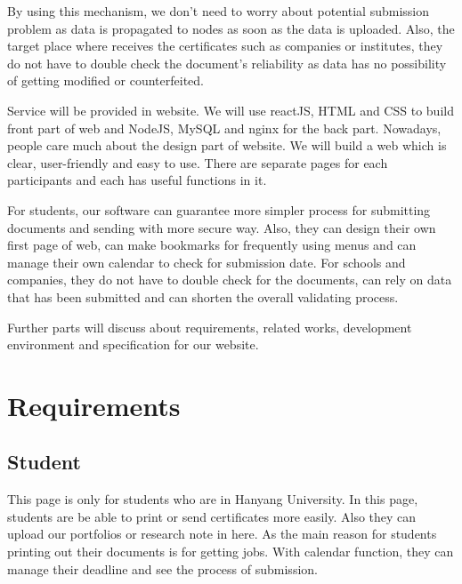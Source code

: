 \documentclass[conference]{IEEEtran}
\begin{document}
By using this mechanism, we don’t need to worry about potential submission problem as data is propagated to nodes as soon as the data is uploaded. Also, the target place where receives the certificates such as companies or institutes, they do not have to double check the document’s reliability as data has no possibility of getting modified or counterfeited.

Service will be provided in website. We will use reactJS, HTML and CSS to build front part of web and NodeJS, MySQL and nginx for the back part. Nowadays, people care much about the design part of website. We will build a web which is clear, user-friendly and easy to use. There are separate pages for each participants and each has useful functions in it. 

For students, our software can guarantee more simpler process for submitting documents and sending with more secure way. Also, they can design their own first page of web, can make bookmarks for frequently using menus and can manage their own calendar to check for submission date. For schools and companies, they do not have to double check for the documents, can rely on data that has been submitted and can shorten the overall validating process. 

Further parts will discuss about requirements, related works, development environment and specification for our website.


\section{Requirements}
\subsection{Student}
This page is only for students who are in Hanyang University. In this page, students are be able to print or send certificates more easily. Also they can upload our portfolios or research note in here. As the main reason for students printing out their documents is for getting jobs. With calendar function, they can manage their deadline and see the process of submission.\\ 
\end{document}
